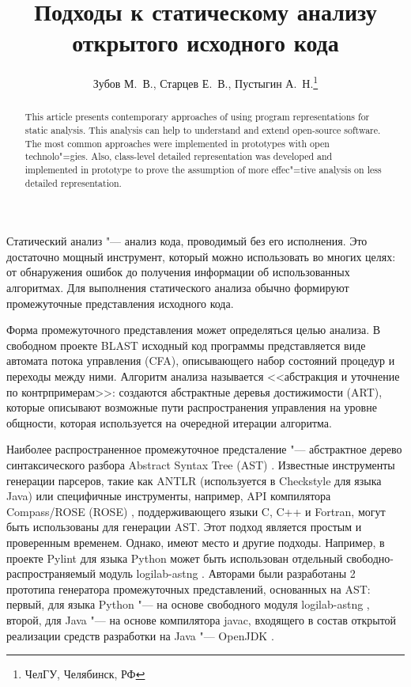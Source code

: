 \documentclass[10pt, a5paper]{article}
\begin{document}
\title{Подходы к статическому анализу открытого исходного кода}%

\author{Зубов М.~В., Старцев Е.~В., Пустыгин А.~Н.\footnote{ЧелГУ, Челябинск, РФ}}
\maketitle

\begin{abstract}
This article presents contemporary approaches of using program representations for static analysis. This analysis can help to understand and extend open-source software. The most common approaches were implemented in prototypes with open technolo"=gies. Also, class-level detailed representation was developed and implemented in prototype to prove the assumption of more effec"=tive analysis on less detailed representation.
\end{abstract}

Статический анализ  "--- анализ кода, проводимый без его исполнения. Это достаточно мощный инструмент, который можно использовать во многих целях: от обнаружения ошибок до получения информации об использованных алгоритмах. Для выполнения статического анализа обычно формируют промежуточные представления исходного кода.

Форма промежуточного представления может определяться целью анализа. В свободном проекте BLAST \cite{Zubov1} исходный код программы представляется виде автомата потока управления (CFA), описывающего набор состояний процедур и переходы между ними. Алгоритм анализа называется <<абстракция и уточнение по  контрпримерам>>: создаются абстрактные деревья достижимости (ART), которые описывают возможные пути распространения управления на уровне общности, которая используется на очередной итерации алгоритма.

Наиболее распространенное промежуточное предсталение "--- абстрактное дерево синтаксического разбора Abstract Syntax Tree \linebreak(AST) \cite{Zubov2}. Известные инструменты генерации парсеров, такие как ANTLR \cite{Zubov3} (используется в Checkstyle \cite{Zubov4} для языка Java) или специфичные инструменты, например, API компилятора Compass/ROSE (ROSE) \cite{Zubov5}, поддерживающего языки C, C++ и Fortran, могут быть использованы для генерации AST. Этот подход является простым и проверенным временем. Однако, имеют место и другие подходы. Например, в проекте Pylint \cite{Zubov6} для языка Python может быть использован отдельный свободно-распространяемый модуль logilab-astng \cite{Zubov7}. Авторами были разработаны 2 прототипа генератора промежуточных представлений, основанных на AST: первый, для языка Python "--- на основе свободного модуля logilab-astng \cite{Zubov7}, второй, для Java "--- на основе компилятора javac, входящего в состав открытой реализации средств разработки на Java "--- OpenJDK \cite{Zubov8}.
\end{document}
